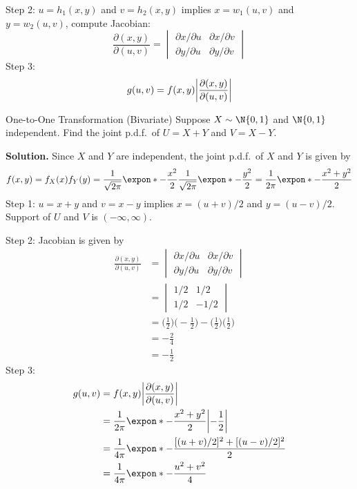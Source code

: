 Step 2: $ u=h_1(x,y) $ and $ v=h_2(x,y) $ implies
$ x=w_1(u,v) $ and $ y=w_2(u,v) $, compute Jacobian:
\[ \frac{\partial(x,y)}{\partial(u,v)}=\begin{vmatrix}
        \partial x/\partial u & \partial x/\partial v \\
        \partial y/\partial u & \partial y/\partial v
    \end{vmatrix} \]
Step 3:
\[ g(u,v)=f(x,y)\abs*{\frac{\partial(x,y)}{\partial(u,v)} } \]
\begin{Example}{One-to-One Transformation (Bivariate)}{}
    Suppose $ X \sim \N{0,1} $ and $ \N{0,1} $ independent.
    Find the joint p.d.f.\ of $ U=X+Y $ and $ V=X-Y $.

    \textbf{Solution.} Since $ X $ and $ Y $ are independent,
    the joint p.d.f.\ of $ X $ and $ Y $ is given by
    \[ f(x,y)=f_X(x)f_Y(y)=\frac{1}{\sqrt{2\pi}}\expon*{-\frac{x^2}{2}}
        \frac{1}{\sqrt{2\pi}}\expon*{-\frac{y^2}{2}}=
        \frac{1}{2\pi}\expon*{-\frac{x^2+y^2}{2}}  \]
    Step 1: $ u=x+y $ and $ v=x-y $ implies $ x=(u+v)/2 $
    and $ y=(u-v)/2 $. Support of $ U $ and $ V $ is $ (-\infty,\infty) $.

    Step 2: Jacobian is given by
    \begin{align*}
        \frac{\partial(x,y)}{\partial(u,v)}
         & =\begin{vmatrix}
            \partial x/\partial u & \partial x/\partial v \\
            \partial y/\partial u & \partial y/\partial v
        \end{vmatrix}                               \\
         & =\begin{vmatrix}
            1/2 & 1/2  \\
            1/2 & -1/2
        \end{vmatrix}                               \\
         & =\biggl( \frac{1}{2} \biggr)\biggl( -\frac{1}{2} \biggr)
        -\biggl( \frac{1}{2} \biggr)\biggl( \frac{1}{2} \biggr)     \\
         & =-\frac{2}{4}                                            \\
         & =-\frac{1}{2}
    \end{align*}
    Step 3:
    \begin{align*}
        g(u,v)
         & =f(x,y)\abs*{\frac{\partial(x,y)}{\partial(u,v)}}             \\
         & =\frac{1}{2\pi}\expon*{-\frac{x^2+y^2}{2}}\abs*{-\frac{1}{2}} \\
         & =\frac{1}{4\pi}\expon*{-\frac{[(u+v)/2]^2+[(u-v)/2]^2}{2}}    \\
         & =\frac{1}{4\pi}\expon*{-\frac{u^2+v^2}{4}}
    \end{align*}
\end{Example}
